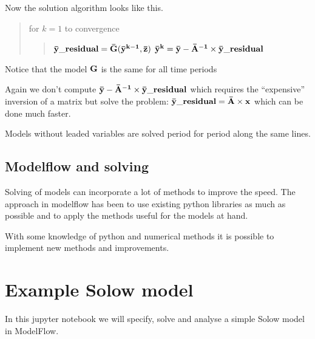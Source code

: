 \documentclass[letterpaper,10pt,english]{jupyterBook}
\begin{document}
\sphinxAtStartPar
Now the solution algorithm looks like this.
\begin{quote}

\sphinxAtStartPar
for \(k = 1\) to convergence
\begin{quote}

\sphinxAtStartPar
\(\bf{\bar y\_residual} = \bf {\bar G(\bar y^{k-1},\bar z) }\)
\(\bf{\bar y^{k}} =  \bf{\bar y} - \bf{\bar A}^{-1} \times \bf {\bar y\_residual}\)
\end{quote}
\end{quote}

\sphinxAtStartPar
Notice that the model \(\bf G\) is the same for all time periods

\sphinxAtStartPar
Again we don’t compute \(\bf{\bar y} - \bf{\bar A}^{-1} \times \bf {\bar y\_residual}\) which requires the “expensive” inversion of a matrix but solve the problem: \(\bf{\bar y\_residual}=\bf{\bar A} \times \bf  x\) which can be done much faster.

\sphinxAtStartPar
Models without leaded variables are solved period for period along the same lines.


\section{Modelflow and solving}
\label{\detokenize{content/notebooks/intro/model and solution:modelflow-and-solving}}
\sphinxAtStartPar
Solving of models can incorporate a lot of methods to improve the speed. The approach in modelflow has been to use existing python libraries as much as possible and to apply the methods useful for the models at hand.

\sphinxAtStartPar
With some knowledge of python and numerical methods it is possible to implement new methods and improvements.

\sphinxstepscope


\chapter{Example Solow model}
\label{\detokenize{content/notebooks/intro/Example Solow:example-solow-model}}\label{\detokenize{content/notebooks/intro/Example Solow::doc}}
\sphinxAtStartPar
In this jupyter notebook we will specify, solve and analyse a simple Solow model in ModelFlow.
\end{document}
